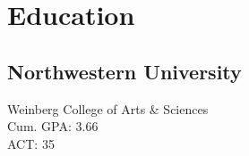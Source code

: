 
\section{Education}

\subsection{Northwestern University}
Weinberg College of Arts \& Sciences
\\ Cum. GPA: 3.66
\\ ACT: 35
\sectionsep
